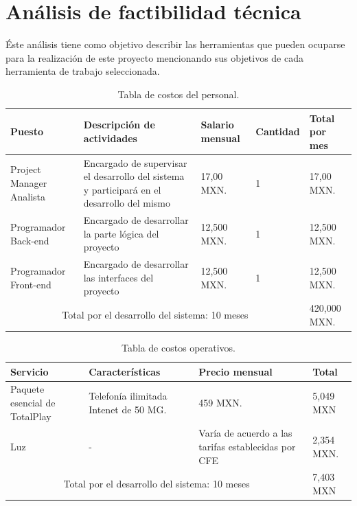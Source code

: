	
	\section{An\'alisis de factibilidad t\'ecnica}
	\noindent Éste análisis tiene como objetivo describir las herramientas que pueden ocuparse para la realización de este proyecto mencionando sus objetivos de cada herramienta de trabajo seleccionada.
	
	\begin{table}[htbp]
		\begin{center}
			\begin{tabular}{|p{20mm}|p{30mm}|p{15mm}|p{15mm}|p{15mm}|}
				\hline
				\textbf{Puesto} & \textbf{Descripción de actividades} & \textbf{Salario mensual} & \textbf{Cantidad} & \textbf{Total por mes}\\ \hline 
				Project Manager Analista & Encargado de supervisar el desarrollo del sistema y participará en el desarrollo del mismo & 17,00 MXN. & 1 &17,00 MXN. \\ \hline
				
				Programador Back-end & Encargado de desarrollar la parte lógica del proyecto & 12,500 MXN. & 1 &12,500 MXN. \\ \hline
				
				Programador Front-end & Encargado de desarrollar las interfaces del proyecto & 12,500 MXN. & 1 &12,500 MXN.\\ \hline
				
				\multicolumn{4}{|c|}{Total por el desarrollo del sistema: 10 meses} & 420,000 MXN.\\ \hline
			\end{tabular}
			\caption{Tabla de costos del personal.}
			\label{tablacostopersonal}
		\end{center}
	\end{table}
	
	\begin{table}[htbp]
		\begin{center}
			\begin{tabular}{|p{20mm}|p{30mm}|p{15mm}|p{15mm}|}
				\hline
				\textbf{Servicio}  & \textbf{Características} & \textbf{Precio mensual} & \textbf{Total} \\ \hline 
				Paquete esencial de TotalPlay & Telefonía ilimitada Intenet de 50 MG. & 459 MXN. & 5,049 MXN \\ \hline
				
				Luz & - & Varía de acuerdo a las tarifas establecidas por CFE & 2,354 MXN. \\ \hline
				
				\multicolumn{3}{|c|}{Total por el desarrollo del sistema: 10 meses} & 7,403 MXN\\ \hline
			\end{tabular}
			\caption{Tabla de costos operativos.}
			\label{tablacostosoperativos}
		\end{center}
	\end{table}
\pagebreak
	
